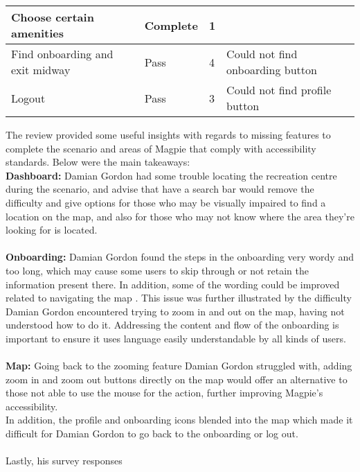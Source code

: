 \begin{table}[h!]
\begin{tabular}{|p{}|p{}|p{}|p{}|}
        \hline
        Choose certain amenities         & Complete        & 1                   &                                                                                   \\
        \hline
        Find onboarding and exit midway  & Pass            & 4                   & Could not find onboarding button                                                  \\
        \hline
        Logout                           & Pass            & 3                   & Could not find profile button                                                     \\
        \hline
    \end{tabular}
\end{table}

The review provided some useful insights with regards to missing features to complete the scenario and areas of Magpie that comply with accessibility standards. Below were the main takeaways:\\
\textbf{Dashboard: }
Damian Gordon had some trouble locating the recreation centre during the scenario, and advise that have a search bar would remove the difficulty and give options for those who may be visually impaired to find a location on the map, and also for those who may not know where the area they're looking for is located.\\\\
\textbf{Onboarding: }
Damian Gordon found the steps in the onboarding very wordy and too long, which may cause some users to skip through or not retain the information present there. In addition, some of the wording could be improved related to navigating the map . This issue was further illustrated by the difficulty Damian Gordon encountered trying to zoom in and out on the map, having not understood how to do it. Addressing the content and flow of the onboarding is important to ensure it uses language easily understandable by all kinds of users.\\\\
\textbf{Map: }
Going back to the zooming feature Damian Gordon struggled with, adding zoom in and zoom out buttons directly on the map would offer an alternative to those not able to use the mouse for the action, further improving Magpie's accessibility.\\In addition, the profile and onboarding icons blended into the map which made it difficult for Damian Gordon to go back to the onboarding or log out.\\\\

Lastly, his survey responses 
